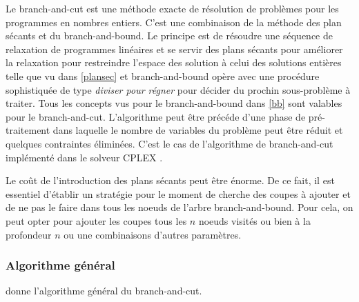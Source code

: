 \documentclass[12pt,a4paper,oneside]{book}
\theoremstyle{definition}
\begin{document}
		Le branch-and-cut est une méthode exacte de résolution de problèmes pour les programmes en nombres entiers. C'est une combinaison de la méthode des plan sécants et du branch-and-bound. Le principe est de résoudre une séquence de relaxation de programmes linéaires et se servir des plans sécants pour améliorer la relaxation pour restreindre l'espace des solution à celui des solutions entières telle que vu dans \ref{plansec} et branch-and-bound opère avec une procédure sophistiquée de type \textit{diviser pour régner} pour décider du prochin sous-problème à traiter. Tous les concepts vus pour le branch-and-bound dans \ref{bb} sont valables pour le branch-and-cut. 
		L'algorithme peut être précéde d'une phase de pré-traitement dans laquelle le nombre de variables du problème peut être réduit et quelques contraintes éliminées. C'est le cas de l'algorithme de branch-and-cut implémenté dans le solveur CPLEX \cite{manual1987ibm}.
	
	    Le coût de l'introduction des plans sécants peut être énorme.  De ce fait, il est essentiel d'établir un stratégie pour le moment de cherche des coupes à ajouter et de ne pas le faire dans tous les noeuds de l'arbre branch-and-bound. Pour cela, on peut opter pour ajouter les coupes tous les $n$ noeuds visités ou bien à la profondeur $n$ ou une combinaisons d'autres paramètres.
		
		\subsubsection{Algorithme général}
		
		\cite{mitchellbranch} donne l'algorithme général du branch-and-cut.
		
\end{document}
